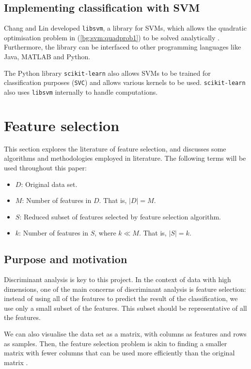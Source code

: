 \documentclass[12pt, twoside, a4paper]{report}
\begin{document}
\subsection{Implementing classification with SVM}
Chang and Lin \cite{libsvm} developed \texttt{libsvm}, a library for SVMs, which allows the quadratic optimisation problem in (\ref{bg:svm:quadprob1}) to be solved analytically \cite{RefWorks:126}. Furthermore, the library can be interfaced to other programming languages like Java, MATLAB and Python.

The Python library \texttt{scikit-learn} also allows SVMs to be trained for classification purposes (\texttt{SVC}) and allows various kernels to be used. \texttt{scikit-learn} also uses \texttt{libsvm} internally to handle computations.

\section{Feature selection} \label{bg:feature_selection}

This section explores the literature of feature selection, and discusses some algorithms and methodologies employed in literature. The following terms will be used throughout this paper:
\begin{itemize}
  \item $D$: Original data set.
  \item $M$: Number of features in $D$. That is, $|D| = M$.
  \item $S$: Reduced subset of features selected by feature selection algorithm.
  \item $k$: Number of features in $S$, where $k \ll M$. That is, $|S| = k$.
\end{itemize}

\subsection{Purpose and motivation} \label{bg:fs:purpose}

Discriminant analysis is key to this project. In the context of data with high dimensions, one of the main concerns of discriminant analysis is feature selection: instead of using all of the features to predict the result of the classification, we use only a small subset of the features. This subset should be representative of all the features.

We can also visualise the data set as a matrix, with columns as features and rows as samples. Then, the feature selection problem is akin to finding a smaller matrix with fewer columns that can be used more efficiently than the original matrix \cite{RefWorks:163}.
\end{document}
